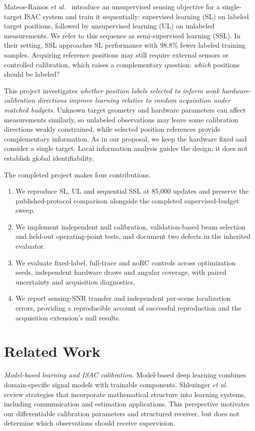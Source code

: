 \documentclass[conference]{IEEEtran}
\begin{document}
Mateos-Ramos \emph{et al.}~\cite{ssl} introduce an unsupervised sensing objective for a single-target ISAC system and train it sequentially: supervised learning (SL) on labeled target positions, followed by unsupervised learning (UL) on unlabeled measurements. We refer to this sequence as semi-supervised learning (SSL). In their setting, SSL approaches SL performance with 98.8\% fewer labeled training samples. Acquiring reference positions may still require external sensors or controlled calibration, which raises a complementary question: \emph{which} positions should be labeled?

This project investigates \emph{whether position labels selected to inform weak hardware-calibration directions improve learning relative to random acquisition under matched budgets}. Unknown target geometry and hardware parameters can affect measurements similarly, so unlabeled observations may leave some calibration directions weakly constrained, while selected position references provide complementary information. As in our proposal, we keep the hardware fixed and consider a single target. Local information analysis guides the design; it does not establish global identifiability.

The completed project makes four contributions.
\begin{enumerate}
\item We reproduce SL, UL and sequential SSL at 85,000 updates and preserve the published-protocol comparison alongside the completed supervised-budget sweep.
\item We implement independent null calibration, validation-based beam selection and held-out operating-point tests, and document two defects in the inherited evaluator.
\item We evaluate fixed-label, full-trace and noRC controls across optimization seeds, independent hardware draws and angular coverage, with paired uncertainty and acquisition diagnostics.
\item We report sensing-SNR transfer and independent per-scene localization errors, providing a reproducible account of successful reproduction and the acquisition extension's null results.
\end{enumerate}
\section{Related Work}
\emph{Model-based learning and ISAC calibration.} Model-based deep learning combines domain-specific signal models with trainable components. Shlezinger \emph{et al.}~\cite{mbdl} review strategies that incorporate mathematical structure into learning systems, including communication and estimation applications. This perspective motivates our differentiable calibration parameters and structured receiver, but does not determine which observations should receive supervision.
\end{document}
